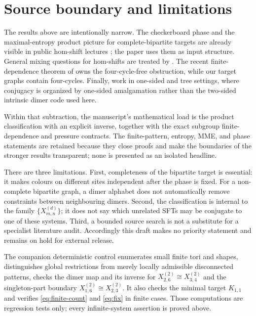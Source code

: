 \section{Source boundary and limitations}\label{sec:scope}

The results above are intentionally narrow.  The checkerboard phase and the
maximal-entropy product picture for complete-bipartite targets are already
visible in public hom-shift lectures \citep{Chandgotia2019Lectures}; the paper
uses them as input structure.  General mixing questions for hom-shifts are
treated by \citet{ChandgotiaMarcus2018}.  The recent finite-dependence theorem
of \citet{ChandgotiaThorat2026} owns the four-cycle-free obstruction, while
our target graphs contain four-cycles.  Finally, \citet{BealBlockGorman2025}
work in one-sided and tree settings, where conjugacy is organized by
one-sided amalgamation rather than the two-sided intrinsic dimer code used
here.

Within that subtraction, the manuscript's mathematical load is the product
classification with an explicit inverse, together with the exact subgroup
finite-dependence and pressure contracts.  The finite-pattern, entropy, MME,
and phase statements are retained because they close proofs and make the
boundaries of the stronger results transparent; none is presented as an
isolated headline.

There are three limitations.  First, completeness of the bipartite target is
essential: it makes colours on different sites independent after the phase
is fixed.  For a non-complete bipartite graph, a dimer alphabet does not
automatically remove constraints between neighbouring dimers.  Second, the
classification is internal to the family $\{X_{m,n}^{(d)}\}$; it does not say
which unrelated SFTs may be conjugate to one of these systems.  Third, a
bounded source search is not a substitute for a specialist literature audit.
Accordingly this draft makes no priority statement and remains on hold for
external release.

The companion deterministic control enumerates small finite tori and shapes,
distinguishes global restrictions from merely locally admissible disconnected
patterns, checks the dimer map and its inverse for
$X_{2,6}^{(2)}\cong X_{3,4}^{(2)}$ and the singleton-part boundary
$X_{1,6}^{(2)}\cong X_{2,3}^{(2)}$.  It also checks the minimal target
$K_{1,1}$ and verifies
\eqref{eq:finite-count} and \eqref{eq:fix} in finite cases.  Those
computations are regression tests only; every infinite-system assertion is
proved above.
